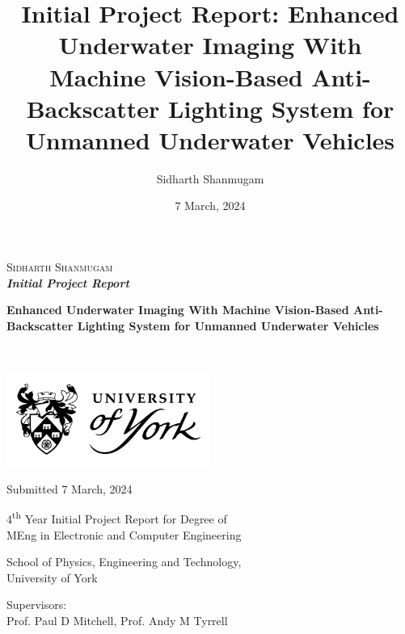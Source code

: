 \documentclass[12pt]{article}
\title{Initial Project Report: Enhanced Underwater Imaging With Machine Vision-Based Anti-Backscatter Lighting System for Unmanned Underwater Vehicles}
\author{Sidharth Shanmugam}
\date{7 March, 2024}
\begin{document}
\begin{onehalfspace}
    \begin{titlepage}

        \begin{FlushLeft}
            \textsc{\LARGE Sidharth Shanmugam}\\[0.8cm]
    
            \Large{
                \bfseries{
                    \emph{Initial Project Report}}}
            
            \hrulefill
    
            \LARGE{
                \bfseries{
                    Enhanced Underwater Imaging With Machine Vision-Based Anti-Backscatter Lighting System for Unmanned Underwater Vehicles}}
            
            \hrulefill\\[5.4cm]
    
        \end{FlushLeft}
        
        \vfill

        \begin{Center}
    
            \includegraphics[width=0.5\textwidth]{assets/uoy-logo-stacked-shield.png}

            \vfill
    
            \textsf{
                \large{
                    Submitted 7 March, 2024}}
    
            \vfill
    
            \textsf{
                \large{
                    4\textsuperscript{th} Year Initial Project Report for Degree of\\ MEng in Electronic and Computer Engineering}}
    
            \vfill
            
            \textsf{
                \large{
                    School of Physics, Engineering and Technology,\\ University of York}}
    
            \vfill
    
            \textsf{
                \large{
                    Supervisors:\\[0.2cm] Prof. Paul D Mitchell, Prof. Andy M Tyrrell}}
        
        \end{Center}
        
    \end{titlepage}
\end{onehalfspace}
\end{document}
